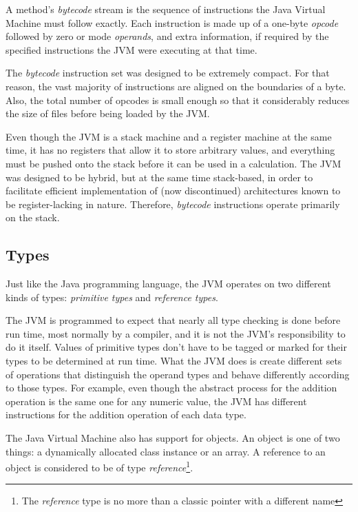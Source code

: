 \documentclass[english,runningheads,a4paper]{llncs}[2018/03/10]
\begin{document}
A method's \textit{bytecode} stream is the sequence of instructions the Java
Virtual Machine must follow exactly. Each instruction is made up of a one-byte
\textit{opcode} followed by zero or mode \textit{operands}, and extra
information, if required by the specified instructions the JVM were executing at
that time.

The \textit{bytecode} instruction set was designed to be extremely compact. For
that reason, the vast majority of instructions are aligned on the boundaries of
a byte. Also, the total number of opcodes is small enough so that it
considerably reduces the size of files before being loaded by the JVM.

Even though the JVM is a stack machine and a register machine at the same time,
it has no registers that allow it to store arbitrary values, and everything must
be pushed onto the stack before it can be used in a calculation. The JVM was
designed to be hybrid, but at the same time stack-based, in order to facilitate
efficient implementation of (now discontinued) architectures known to be
register-lacking in nature. Therefore, \textit{bytecode} instructions operate
primarily on the stack. 

\newpage
\subsection*{Types}
Just like the Java programming language, the JVM operates on two different kinds
of types: \textit{primitive types} and \textit{reference types}.

The JVM is programmed to expect that nearly all type checking is done before run
time, most normally by a compiler, and it is not the JVM's responsibility to do
it itself. Values of primitive types don't have to be tagged or marked for their
types to be determined at run time. What the JVM does is create different sets
of operations that distinguish the operand
types and behave differently according to those types. For example, even though
the abstract process for the addition operation is the same one for any numeric
value, the JVM has different instructions for the addition operation of each
data type. \parencite{vmachinedesign}

The Java Virtual Machine also has support for objects. An object is one of two
things: a dynamically allocated class instance or an array. A reference to an
object is considered to be of type \textit{reference}\footnote{The
\textit{reference} type is no more than a classic pointer with a different name}.
\end{document}
